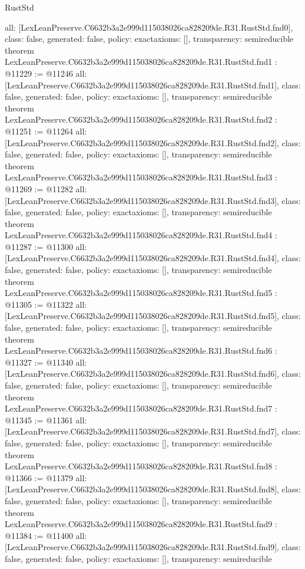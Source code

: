 \begin{lexlean}{RustStd}
\begin{coremodule}
{  all: [LexLeanPreserve.C6632b3a2e999d115038026ca828209de.R31.RustStd.fnd0],
  class: false,
  generated: false,
  policy: exact{axioms: []},
  transparency: semireducible
}
theorem LexLeanPreserve.C6632b3a2e999d115038026ca828209de.R31.RustStd.fnd1 : @11229 := @11246 {
  all: [LexLeanPreserve.C6632b3a2e999d115038026ca828209de.R31.RustStd.fnd1],
  class: false,
  generated: false,
  policy: exact{axioms: []},
  transparency: semireducible
}
theorem LexLeanPreserve.C6632b3a2e999d115038026ca828209de.R31.RustStd.fnd2 : @11251 := @11264 {
  all: [LexLeanPreserve.C6632b3a2e999d115038026ca828209de.R31.RustStd.fnd2],
  class: false,
  generated: false,
  policy: exact{axioms: []},
  transparency: semireducible
}
theorem LexLeanPreserve.C6632b3a2e999d115038026ca828209de.R31.RustStd.fnd3 : @11269 := @11282 {
  all: [LexLeanPreserve.C6632b3a2e999d115038026ca828209de.R31.RustStd.fnd3],
  class: false,
  generated: false,
  policy: exact{axioms: []},
  transparency: semireducible
}
theorem LexLeanPreserve.C6632b3a2e999d115038026ca828209de.R31.RustStd.fnd4 : @11287 := @11300 {
  all: [LexLeanPreserve.C6632b3a2e999d115038026ca828209de.R31.RustStd.fnd4],
  class: false,
  generated: false,
  policy: exact{axioms: []},
  transparency: semireducible
}
theorem LexLeanPreserve.C6632b3a2e999d115038026ca828209de.R31.RustStd.fnd5 : @11305 := @11322 {
  all: [LexLeanPreserve.C6632b3a2e999d115038026ca828209de.R31.RustStd.fnd5],
  class: false,
  generated: false,
  policy: exact{axioms: []},
  transparency: semireducible
}
theorem LexLeanPreserve.C6632b3a2e999d115038026ca828209de.R31.RustStd.fnd6 : @11327 := @11340 {
  all: [LexLeanPreserve.C6632b3a2e999d115038026ca828209de.R31.RustStd.fnd6],
  class: false,
  generated: false,
  policy: exact{axioms: []},
  transparency: semireducible
}
theorem LexLeanPreserve.C6632b3a2e999d115038026ca828209de.R31.RustStd.fnd7 : @11345 := @11361 {
  all: [LexLeanPreserve.C6632b3a2e999d115038026ca828209de.R31.RustStd.fnd7],
  class: false,
  generated: false,
  policy: exact{axioms: []},
  transparency: semireducible
}
theorem LexLeanPreserve.C6632b3a2e999d115038026ca828209de.R31.RustStd.fnd8 : @11366 := @11379 {
  all: [LexLeanPreserve.C6632b3a2e999d115038026ca828209de.R31.RustStd.fnd8],
  class: false,
  generated: false,
  policy: exact{axioms: []},
  transparency: semireducible
}
theorem LexLeanPreserve.C6632b3a2e999d115038026ca828209de.R31.RustStd.fnd9 : @11384 := @11400 {
  all: [LexLeanPreserve.C6632b3a2e999d115038026ca828209de.R31.RustStd.fnd9],
  class: false,
  generated: false,
  policy: exact{axioms: []},
  transparency: semireducible
}
\end{coremodule}
\end{lexlean}
